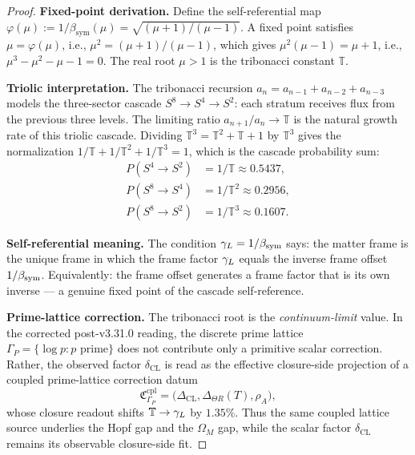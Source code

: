 \begin{proof}
\textbf{Fixed-point derivation.}
Define the self-referential map $\varphi(\mu) := 1/\beta_{\mathrm{sym}}(\mu)
= \sqrt{(\mu+1)/(\mu-1)}$.
A fixed point satisfies $\mu = \varphi(\mu)$, i.e.,
$\mu^2 = (\mu+1)/(\mu-1)$, which gives $\mu^2(\mu-1) = \mu+1$, i.e.,
$\mu^3 - \mu^2 - \mu - 1 = 0$.
The real root $\mu > 1$ is the tribonacci constant $\mathbb{T}$.

\textbf{Triolic interpretation.}
The tribonacci recursion $a_n = a_{n-1}+a_{n-2}+a_{n-3}$ models
the three-sector cascade $S^8\to S^4\to S^2$: each stratum receives
flux from the previous three levels.
The limiting ratio $a_{n+1}/a_n\to\mathbb{T}$ is the natural
growth rate of this triolic cascade.
Dividing $\mathbb{T}^3 = \mathbb{T}^2+\mathbb{T}+1$ by $\mathbb{T}^3$
gives the normalization
$1/\mathbb{T}+1/\mathbb{T}^2+1/\mathbb{T}^3 = 1$,
which is the cascade probability sum:
\begin{align*}
  P(S^4\to S^2) &= 1/\mathbb{T} \approx 0.5437, \\
  P(S^8\to S^4) &= 1/\mathbb{T}^2 \approx 0.2956, \\
  P(S^8\to S^2) &= 1/\mathbb{T}^3 \approx 0.1607.
\end{align*}

\textbf{Self-referential meaning.}
The condition $\gamma_L = 1/\beta_{\mathrm{sym}}$ says: the matter frame is the unique frame
in which the frame factor $\gamma_L$ equals the inverse frame offset $1/\beta_{\mathrm{sym}}$.
Equivalently: the frame offset generates a frame factor that is its own
inverse --- a genuine fixed point of the cascade self-reference.

\textbf{Prime-lattice correction.}
The tribonacci root is the \emph{continuum-limit} value.
In the corrected post-v3.31.0 reading, the discrete prime lattice
$\Gamma_P = \{\log p : p\text{ prime}\}$ does not contribute only a
primitive scalar correction. Rather, the observed factor
$\delta_{\mathrm{CL}}$ is read as the effective closure-side projection
of a coupled prime-lattice correction datum
\[
  \mathfrak{C}_{\Gamma_P}^{\mathrm{cpl}}
  =
  \bigl(
  \Delta_{\mathrm{CL}},
  \Delta_{\Theta R}(T),
  \rho_A
  \bigr),
\]
whose closure readout shifts $\mathbb{T}\to\gamma_L$ by $1.35\%$.
Thus the same coupled lattice source underlies the Hopf gap and the
$\Omega_M$ gap, while the scalar factor $\delta_{\mathrm{CL}}$ remains
its observable closure-side fit.


\end{proof}
